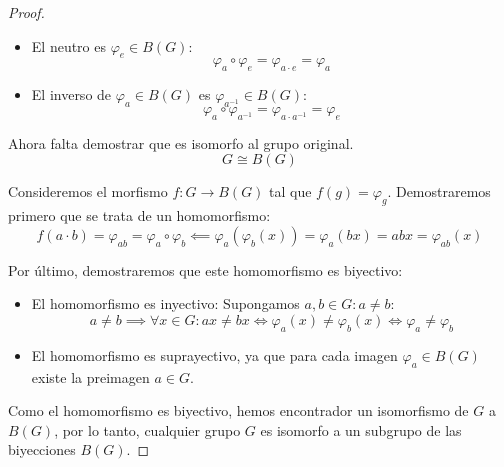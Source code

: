 \begin{proof}
\begin{itemize}
        \item El neutro es $\varphi_e \in B(G)$:
        \begin{equation}
            \varphi_{a} \circ \varphi_{e} = \varphi_{a \cdot e} = \varphi_{a}
        \end{equation}

        \item El inverso de $\varphi_a \in B(G)$ es $\varphi_{a^{-1}} \in B(G)$:
        \begin{equation}
            \varphi_a \circ \varphi_{a^{-1}} = \varphi_{a \cdot a^{-1}} = \varphi_e
        \end{equation}
    \end{itemize}
    
    Ahora falta demostrar que es isomorfo al grupo original.
    \begin{equation}
        G \cong B(G)
    \end{equation}

    Consideremos el morfismo $f:G \to B(G)$ tal que $f(g) = \varphi_g$. Demostraremos primero que se trata de un homomorfismo:
    \begin{equation}
        f(a \cdot b) = \varphi_{ab} = \varphi_a \circ \varphi_b \impliedby \varphi_a(\varphi_b(x)) = \varphi_a(bx) = abx = \varphi_{ab}(x)
    \end{equation}

    Por último, demostraremos que este homomorfismo es biyectivo:

    \begin{itemize}
        \item El homomorfismo es inyectivo: Supongamos $a,b \in G : a\neq b$:
            \begin{equation}
                a \neq b \implies \forall x \in G: ax \neq bx \iff \varphi_a(x) \neq \varphi_b(x) \iff \varphi_a \neq \varphi_b
            \end{equation}
        \item El homomorfismo es suprayectivo, ya que para cada imagen $\varphi_a \in B(G)$ existe la preimagen $a \in G$.
    \end{itemize}

    Como el homomorfismo es biyectivo, hemos encontrador un isomorfismo de $G$ a $B(G)$, por lo tanto, cualquier grupo $G$ es isomorfo a un subgrupo de las biyecciones $B(G)$.
\end{proof}
